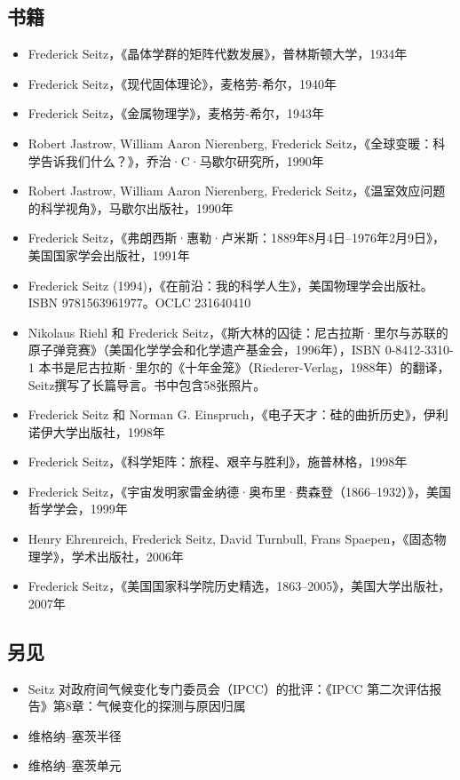 \subsection{书籍}
\begin{itemize}
\item Frederick Seitz，《晶体学群的矩阵代数发展》，普林斯顿大学，1934年  
\item Frederick Seitz，《现代固体理论》，麦格劳-希尔，1940年  
\item Frederick Seitz，《金属物理学》，麦格劳-希尔，1943年  
\item Robert Jastrow, William Aaron Nierenberg, Frederick Seitz，《全球变暖：科学告诉我们什么？》，乔治·C·马歇尔研究所，1990年  
\item Robert Jastrow, William Aaron Nierenberg, Frederick Seitz，《温室效应问题的科学视角》，马歇尔出版社，1990年  
\item Frederick Seitz，《弗朗西斯·惠勒·卢米斯：1889年8月4日–1976年2月9日》，美国国家学会出版社，1991年  
\item Frederick Seitz (1994)，《在前沿：我的科学人生》，美国物理学会出版社。ISBN 9781563961977。OCLC 231640410
\item Nikolaus Riehl 和 Frederick Seitz，《斯大林的囚徒：尼古拉斯·里尔与苏联的原子弹竞赛》（美国化学学会和化学遗产基金会，1996年），ISBN 0-8412-3310-1  
  本书是尼古拉斯·里尔的《十年金笼》（Riederer-Verlag，1988年）的翻译，Seitz撰写了长篇导言。书中包含58张照片。
\item Frederick Seitz 和 Norman G. Einspruch，《电子天才：硅的曲折历史》，伊利诺伊大学出版社，1998年
\item Frederick Seitz，《科学矩阵：旅程、艰辛与胜利》，施普林格，1998年
\item Frederick Seitz，《宇宙发明家雷金纳德·奥布里·费森登（1866–1932）》，美国哲学学会，1999年
\item Henry Ehrenreich, Frederick Seitz, David Turnbull, Frans Spaepen，《固态物理学》，学术出版社，2006年
\item Frederick Seitz，《美国国家科学院历史精选，1863–2005》，美国大学出版社，2007年
\end{itemize}
\subsection{另见}
\begin{itemize}
\item Seitz 对政府间气候变化专门委员会（IPCC）的批评：《IPCC 第二次评估报告》第8章：气候变化的探测与原因归属
\item 维格纳–塞茨半径
\item 维格纳–塞茨单元
\end{itemize}
